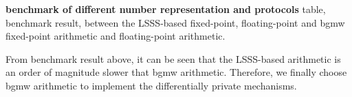\textbf{benchmark of different number representation and protocols}
table, benchmark result, between the LSSS-based fixed-point, floating-point and bgmw fixed-point arithmetic and floating-point arithmetic. 

From benchmark result above, it can be seen that the LSSS-based arithmetic is an order of magnitude slower that bgmw arithmetic. Therefore, we finally choose bgmw arithmetic to implement the differentially private mechanisms. 










